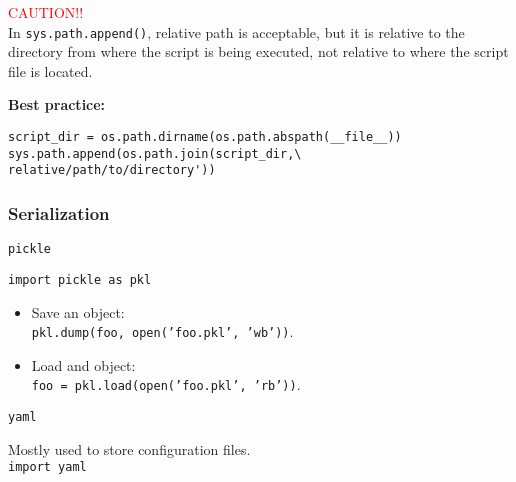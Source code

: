 \begin{mdframed}[backgroundcolor=magenta!10,linecolor=magenta]
    \vspace{6pt}
    \textcolor{red}{CAUTION!!}\\
    \vspace{1pt}
    In \texttt{sys.path.append()}, relative path is acceptable, but it is relative to the directory from where the script is being executed, not relative to where the script file is located.\\

\end{mdframed}
\begin{mdframed}[backgroundcolor=magenta!10,linecolor=magenta]

    \textbf{Best practice:}\\
    \vspace{-16pt}
        \begin{verbatim}
script_dir = os.path.dirname(os.path.abspath(__file__))
sys.path.append(os.path.join(script_dir,\
relative/path/to/directory'))
        \end{verbatim}
\end{mdframed}

\subsubsection{Serialization}

\begin{center}
    \large{\texttt{pickle}}\\
\end{center}
 
\texttt{import pickle as pkl}
\begin{itemize}
\item Save an object:\\
        \texttt{pkl.dump(foo, open('foo.pkl', 'wb'))}.
\item Load and object:\\
        \texttt{foo = pkl.load(open('foo.pkl', 'rb'))}.
\end{itemize}


\begin{center}
    \large{\texttt{yaml}}\\
\end{center}

Mostly used to store configuration files.\\

\texttt{import yaml}

